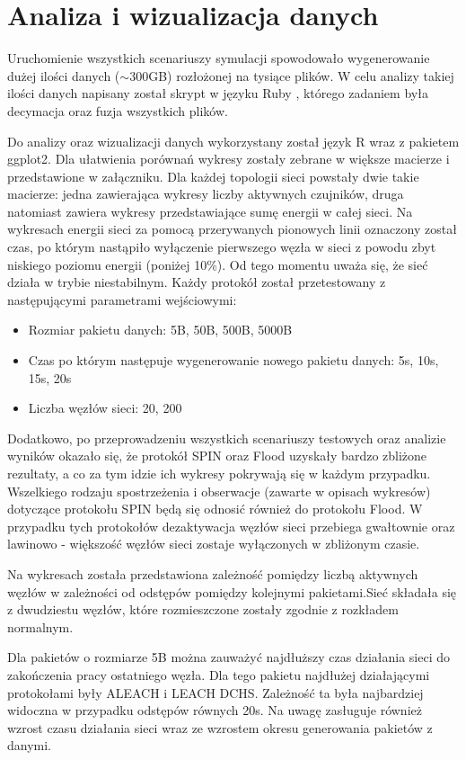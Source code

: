 \section{Analiza i wizualizacja danych} \label{sec:analysis}
Uruchomienie wszystkich scenariuszy symulacji spowodowało wygenerowanie dużej ilości danych ($\sim$300GB) rozłożonej na tysiące plików. W celu analizy takiej ilości danych napisany został skrypt w języku Ruby \cite{ruby}, którego zadaniem była decymacja oraz fuzja wszystkich plików.

Do analizy oraz wizualizacji danych wykorzystany został język R wraz z pakietem ggplot2. Dla ułatwienia porównań wykresy zostały zebrane w większe macierze i przedstawione w załączniku. Dla każdej topologii sieci powstały dwie takie macierze: jedna zawierająca wykresy liczby aktywnych czujników, druga natomiast zawiera wykresy przedstawiające sumę energii w całej sieci. Na wykresach energii sieci za pomocą przerywanych pionowych linii oznaczony został czas, po którym nastąpiło wyłączenie pierwszego węzła w sieci z powodu zbyt niskiego poziomu energii (poniżej 10\%). Od tego momentu uważa się, że sieć działa w trybie niestabilnym.
Każdy protokół został przetestowany z następującymi parametrami wejściowymi:
\begin{itemize}
	\item Rozmiar pakietu danych: 5B, 50B, 500B, 5000B
	\item Czas po którym następuje wygenerowanie nowego pakietu danych: 5s, 10s, 15s, 20s
	\item Liczba węzłów sieci: 20, 200
\end{itemize}

Dodatkowo, po przeprowadzeniu wszystkich scenariuszy testowych oraz analizie wyników okazało się, że protokół SPIN oraz Flood uzyskały bardzo zbliżone rezultaty, a co za tym idzie ich wykresy pokrywają się w każdym przypadku. Wszelkiego rodzaju spostrzeżenia i obserwacje (zawarte w opisach wykresów) dotyczące protokołu SPIN będą się odnosić również do protokołu Flood. 
W przypadku tych protokołów dezaktywacja węzłów sieci przebiega gwałtownie oraz lawinowo - większość węzłów sieci zostaje wyłączonych w zbliżonym czasie.

\newpage
Na wykresach została przedstawiona zależność pomiędzy liczbą aktywnych węzłów w zależności od odstępów pomiędzy kolejnymi pakietami.Sieć składała się z dwudziestu węzłów, które rozmieszczone zostały zgodnie z rozkładem normalnym.

Dla pakietów o rozmiarze 5B można zauważyć najdłuższy czas działania sieci do zakończenia pracy ostatniego węzła. Dla tego pakietu najdłużej działającymi protokołami były ALEACH i LEACH DCHS. Zależność ta była najbardziej widoczna w przypadku odstępów równych 20s. Na uwagę zasługuje również wzrost czasu działania sieci wraz ze wzrostem okresu generowania pakietów z danymi.

